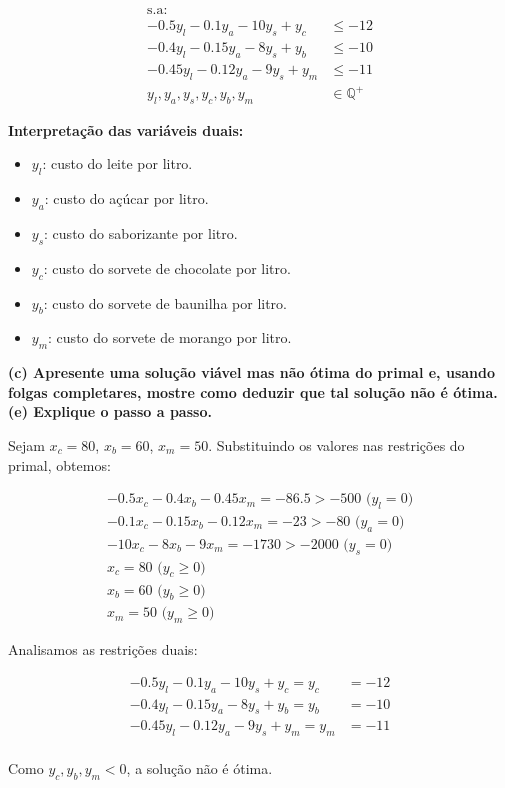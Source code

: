 \documentclass[
    12pt,
    a4paper,
    brazil,
    english
]{article}
\begin{document}
\begin{align}
    \text{s.a:} \nonumber \\
    -0.5y_l - 0.1y_a - 10y_s + y_c &\leq -12 \\
    -0.4y_l - 0.15y_a - 8y_s + y_b &\leq -10 \\
    -0.45y_l - 0.12y_a - 9y_s + y_m &\leq -11 \\
    y_l, y_a, y_s, y_c, y_b, y_m &\in \mathbb{Q}^+
\end{align}

\textbf{Interpretação das variáveis duais:}

\begin{itemize}
    \item $y_l$: custo do leite por litro.
    \item $y_a$: custo do açúcar por litro.
    \item $y_s$: custo do saborizante por litro.
    \item $y_c$: custo do sorvete de chocolate por litro.
    \item $y_b$: custo do sorvete de baunilha por litro.
    \item $y_m$: custo do sorvete de morango por litro.
\end{itemize}

\vspace{0.5cm}

\textbf{(c) Apresente uma solução viável mas não ótima do primal e, usando folgas completares, mostre como
deduzir que tal solução não é ótima. (e) Explique o passo a passo.}

\vspace{0.5cm}

Sejam $x_c = 80$, $x_b = 60$, $x_m = 50$. Substituindo os valores nas restrições do primal, obtemos:

\begin{align*}
        -0.5x_c - 0.4x_b - 0.45x_m  = -86.5 > -500 \text{ (}y_l = 0\text{)} \\
        -0.1x_c - 0.15x_b - 0.12x_m  = -23 > -80 \text{ (}y_a = 0\text{)} \\
        -10x_c - 8x_b - 9x_m  = -1730 > -2000 \text{ (}y_s = 0\text{)} \\
    x_c = 80 \text{ (}y_c \geq 0\text{)} \\
    x_b = 60 \text{ (}y_b \geq 0\text{)} \\
    x_m = 50 \text{ (}y_m \geq 0\text{)}
\end{align*}

Analisamos as restrições duais:

\begin{align*}
    -0.5y_l - 0.1y_a - 10y_s + y_c = y_c &= -12 \\
    -0.4y_l - 0.15y_a - 8y_s + y_b = y_b &= -10 \\
    -0.45y_l - 0.12y_a - 9y_s + y_m = y_m &= -11 \\
\end{align*}

Como $y_c, y_b, y_m < 0$, a solução não é ótima.
\end{document}
